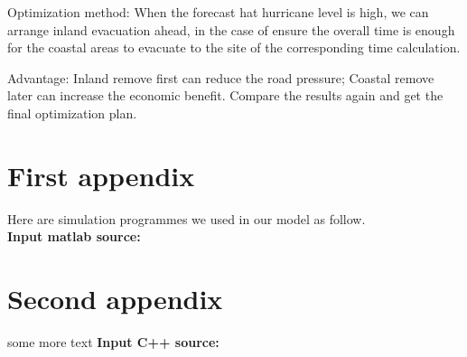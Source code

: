 \documentclass{mcmthesis}
\begin{document}
Optimization method: When the forecast hat hurricane level is high, we can arrange inland evacuation ahead, in the case of ensure the overall time is enough for the coastal areas to evacuate to the site of the corresponding time calculation.

Advantage: Inland remove first can reduce the road pressure; Coastal remove later can increase the economic benefit. Compare the results again and get the final optimization plan.




\begin{appendices}

\section{First appendix}

\lipsum[13]

Here are simulation programmes we used in our model as follow.\\

\textbf{\textcolor[rgb]{0.98,0.00,0.00}{Input matlab source:}}
% 

\section{Second appendix}

some more text \textcolor[rgb]{0.98,0.00,0.00}{\textbf{Input C++ source:}}
% 

\end{appendices}
\end{document}
